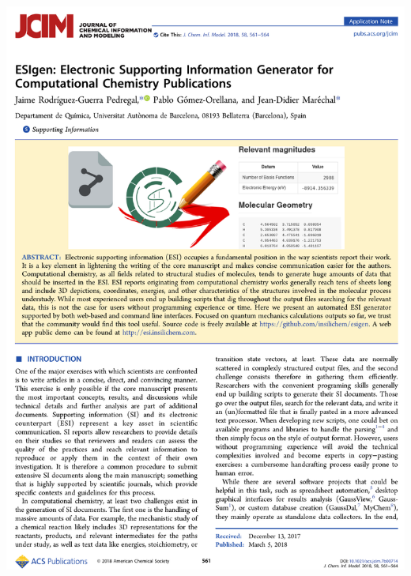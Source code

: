 \includegraphics[width=\textwidth]{figures/pubs/esigen.pdf}
\clearpage\thispagestyle{empty}\mbox{}\clearpage
